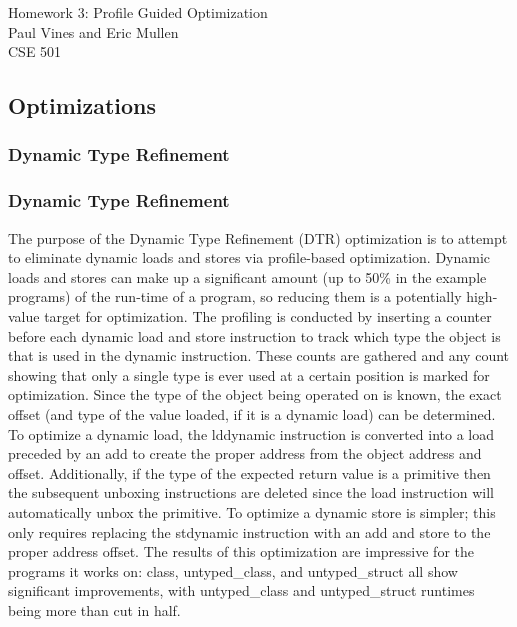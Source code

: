 \documentclass[12pt,letterpaper]{article}
\begin{document}
\begin{flushright}
Homework 3: Profile Guided Optimization\\
Paul Vines and Eric Mullen\\
CSE 501\\
\end{flushright}

\subsection*{Optimizations}
\subsubsection*{Dynamic Type Refinement}
\subsubsection*{Dynamic Type Refinement}
The purpose of the Dynamic Type Refinement (DTR) optimization is to
attempt to eliminate dynamic loads and stores via profile-based
optimization. Dynamic loads and stores can make up a significant
amount (up to 50\% in the example programs) of the run-time of a
program, so reducing them is a potentially high-value target for
optimization.
The profiling is conducted by inserting a counter before
each dynamic load and store instruction to track which type the
object is that is used in the dynamic instruction. These counts are
gathered and any count showing that only a single type is ever used at
a certain position is marked for optimization. Since the type of the
object being operated on is known, the exact offset (and type of the
value loaded, if it is a dynamic load) can be determined. 
To optimize a dynamic load, the lddynamic instruction is converted
into a load preceded by an add to create the proper address from the
object address and offset. Additionally, if the type of the expected
return value is a primitive then the subsequent unboxing instructions
are deleted since the load instruction will automatically unbox the
primitive.
To optimize a dynamic store is simpler; this only requires replacing
the stdynamic instruction with an add and store to the proper address
offset.
The results of this optimization are impressive for the programs it
works on: class, untyped\_class, and untyped\_struct all show
significant improvements, with untyped\_class and untyped\_struct
runtimes being more than cut in half. 
\begin{center}
\end{center}
\end{document}
